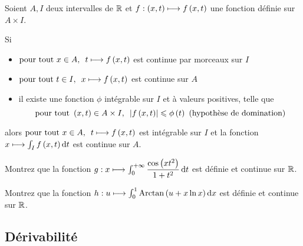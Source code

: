 \begin{theo}
Soient \(A,I\) deux intervalles de \(\mathbb{R}\) et \(f:\left(x,t\right)\longmapsto f\left(x,t\right)\) une fonction définie sur \(A\times I\).

Si

\begin{itemize}
    \item \(\quantifs{\tpt x\in A}t\mapsto f\paren{x,t}\) est continue par morceaux sur \(I\) \\
    \item \(\quantifs{\tpt t\in I}x\mapsto f\paren{x,t}\) est continue sur \(A\) \\
    \item il existe une fonction \(\phi\) intégrable sur \(I\) et à valeurs positives, telle que \[\quantifs{\tpt\paren{x,t}\in A\times I}\abs{f\paren{x,t}}\leq\phi\paren{t}\text{ (hypothèse de domination)}\]
\end{itemize}

alors \(\quantifs{\tpt x\in A}t\mapsto f\paren{x,t}\) est intégrable sur \(I\) et la fonction \(x\mapsto\int_If\paren{x,t}\odif{t}\) est continue sur \(A\).
\end{theo}

\begin{exo}
Montrez que la fonction \(g:x\mapsto\int_0^{\pinf}\dfrac{\cos\paren{xt^2}}{1+t^2}\odif{t}\) est définie et continue sur \(\mathbb{R}\).
\end{exo}

\begin{exo}
Montrez que la fonction \(h:u\mapsto\int_0^1\Arctan\paren{u+x\ln x}\odif{x}\) est définie et continue sur \(\mathbb{R}\).
\end{exo}

\subsection{Dérivabilité}

